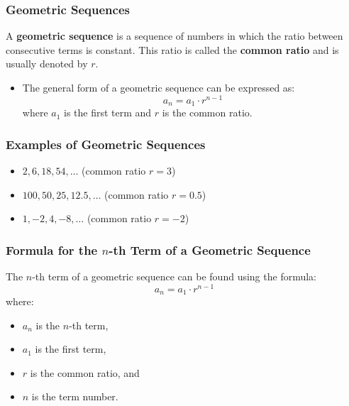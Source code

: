 \begin{frame}
    \frametitle{Geometric Sequences}
    \begin{definition}
        A \textbf{geometric sequence} is a sequence of numbers in which the ratio between consecutive terms is constant. This ratio is called the \textbf{common ratio} and is usually denoted by \(r\).
    \end{definition}
    \begin{itemize}
        \item The general form of a geometric sequence can be expressed as:
        \[
            a_n = a_1 \cdot r^{n-1}
        \]
        where \(a_1\) is the first term and \(r\) is the common ratio.
    \end{itemize}
\end{frame}

\begin{frame}
    \frametitle{Examples of Geometric Sequences}
    \begin{itemize}
        \item \(2, 6, 18, 54, \ldots\) (common ratio \(r = 3\))
        \item \(100, 50, 25, 12.5, \ldots\) (common ratio \(r = 0.5\))
        \item \(1, -2, 4, -8, \ldots\) (common ratio \(r = -2\))
    \end{itemize}
\end{frame}

\begin{frame}
    \frametitle{Formula for the \(n\)-th Term of a Geometric Sequence}
    The \(n\)-th term of a geometric sequence can be found using the formula:
    \[
        a_n = a_1 \cdot r^{n-1}
    \]
    where:
    \begin{itemize}
        \item \(a_n\) is the \(n\)-th term,
        \item \(a_1\) is the first term,
        \item \(r\) is the common ratio, and
        \item \(n\) is the term number.
    \end{itemize}
\end{frame}

